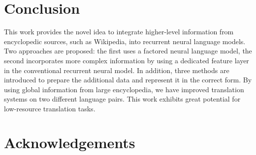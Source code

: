 \documentclass[a4paper]{article}
\begin{document}
\section{Conclusion}
This work provides the novel idea to integrate higher-level information from encyclopedic sources, such as Wikipedia, into recurrent neural language models. Two approaches are proposed: the first uses a factored neural language model, the second incorporates more complex information by using a dedicated feature layer in the conventional recurrent neural model. In addition, three methods are introduced to prepare the additional data and represent it in the correct form.
By using global information from large encyclopedia, we have improved translation systems on two different language pairs.  
This work exhibits great potential for low-resource translation tasks. 



\section{Acknowledgements}
\end{document}
